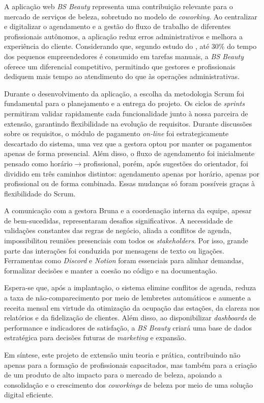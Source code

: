 

A aplicação web \emph{BS Beauty} representa uma contribuição relevante para o mercado de serviços de beleza, sobretudo no modelo de \emph{coworking}. Ao centralizar e digitalizar o agendamento e a gestão do fluxo de trabalho de diferentes profissionais autônomos, a aplicação reduz erros administrativos e melhora a experiência do cliente. Considerando que, segundo estudo do \cite{senac2022}, até 30\% do tempo dos pequenos empreendedores é consumido em tarefas manuais, a \emph{BS Beauty} oferece um diferencial competitivo, permitindo que gestores e profissionais dediquem mais tempo ao atendimento do que às operações administrativas.

Durante o desenvolvimento da aplicação, a escolha da metodologia Scrum foi fundamental para o planejamento e a entrega do projeto. Os ciclos de \emph{sprints} permitiram validar rapidamente cada funcionalidade junto à nossa parceira de extensão, garantindo flexibilidade na evolução de requisitos. Durante discussões sobre os requisitos, o módulo de pagamento \emph{on-line} foi estrategicamente descartado do sistema, uma vez que a gestora optou por manter os pagamentos apenas de forma presencial. Além disso, o fluxo de agendamento foi inicialmente pensado como horário$\to$profissional, porém, após sugestões do orientador, foi dividido em três caminhos distintos: agendamento apenas por horário, apenas por profissional ou de forma combinada. Essas mudanças só foram possíveis graças à flexibilidade do Scrum.

A comunicação com a gestora Bruna e a coordenação interna da equipe, apesar de bem-sucedidas, representaram desafios significativos. A necessidade de validações constantes das regras de negócio, aliada a conflitos de agenda, impossibilitou reuniões presenciais com todos os \emph{stakeholders}. Por isso, grande parte das interações foi conduzida por mensagens de texto ou ligações. Ferramentas como \emph{Discord} e \emph{Notion} foram essenciais para alinhar demandas, formalizar decisões e manter a coesão no código e na documentação.

Espera-se que, após a implantação, o sistema elimine conflitos de agenda, reduza a taxa de não-comparecimento por meio de lembretes automáticos e aumente a receita mensal em virtude da otimização da ocupação das estações, da clareza nos relatórios e da fidelização de clientes. Além disso, ao disponibilizar \emph{dashboards} de performance e indicadores de satisfação, a \emph{BS Beauty} criará uma base de dados estratégica para decisões futuras de \emph{marketing} e expansão.

Em síntese, este projeto de extensão uniu teoria e prática, contribuindo não apenas para a formação de profissionais capacitados, mas também para a criação de um produto de alto impacto para o mercado de beleza, apoiando a consolidação e o crescimento dos \emph{coworkings} de beleza por meio de uma solução digital eficiente.
